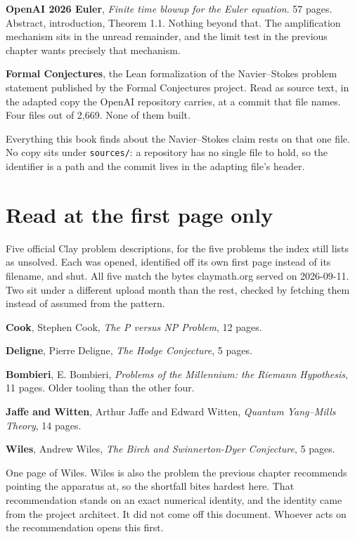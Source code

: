 \textbf{OpenAI 2026 Euler}, \emph{Finite time blowup for the Euler equation}. 57 pages. Abstract,
introduction, Theorem 1.1. Nothing beyond that. The amplification mechanism sits in the unread
remainder, and the limit test in the previous chapter wants precisely that mechanism.

\textbf{Formal Conjectures}, the Lean formalization of the Navier--Stokes problem statement
published by the Formal Conjectures project. Read as source text, in the adapted copy the OpenAI
repository carries, at a commit that file names. Four files out of 2{,}669. None of them built.

Everything this book finds about the Navier--Stokes claim rests on that one file. No copy sits under
\texttt{sources/}: a repository has no single file to hold, so the identifier is a path and the
commit lives in the adapting file's header.

\section{Read at the first page only}

Five official Clay problem descriptions, for the five problems the index still lists as unsolved.
Each was opened, identified off its own first page instead of its filename, and shut. All five match
the bytes claymath.org served on 2026-09-11. Two sit under a different upload month than the rest,
checked by fetching them instead of assumed from the pattern.

\textbf{Cook}, Stephen Cook, \emph{The P versus NP Problem}, 12 pages.

\textbf{Deligne}, Pierre Deligne, \emph{The Hodge Conjecture}, 5 pages.

\textbf{Bombieri}, E. Bombieri, \emph{Problems of the Millennium: the Riemann Hypothesis}, 11
pages. Older tooling than the other four.

\textbf{Jaffe and Witten}, Arthur Jaffe and Edward Witten, \emph{Quantum Yang--Mills Theory}, 14
pages.

\textbf{Wiles}, Andrew Wiles, \emph{The Birch and Swinnerton-Dyer Conjecture}, 5 pages.

One page of Wiles. Wiles is also the problem the previous chapter recommends pointing the apparatus
at, so the shortfall bites hardest here. That recommendation stands on an exact numerical identity,
and the identity came from the project architect. It did not come off this document. Whoever acts on
the recommendation opens this first.

